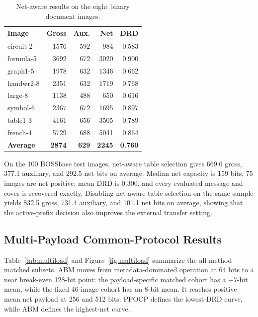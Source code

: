 \documentclass[a4paper,fleqn]{cas-dc}
\begin{document}
\begin{table}[t]
\centering
\caption{Net-aware results on the eight binary document images.}
\label{tab:document-net}
\begin{tabular}{@{}lrrrr@{}}
\toprule
\textbf{Image} & \textbf{Gross} & \textbf{Aux.} & \textbf{Net} & \textbf{DRD} \\
\midrule
circuit-2 & 1576 & 592 & 984 & 0.583 \\
formula-5 & 3692 & 672 & 3020 & 0.900 \\
graph1-5 & 1978 & 632 & 1346 & 0.662 \\
handwr2-8 & 2351 & 632 & 1719 & 0.768 \\
large-8 & 1138 & 488 & 650 & 0.616 \\
symbol-6 & 2367 & 672 & 1695 & 0.897 \\
table1-3 & 4161 & 656 & 3505 & 0.789 \\
french-4 & 5729 & 688 & 5041 & 0.864 \\
\midrule
\textbf{Average} & \textbf{2874} & \textbf{629} & \textbf{2245} & \textbf{0.760} \\
\bottomrule
\end{tabular}
\end{table}

On the 100 BOSSbase test images, net-aware table selection gives 669.6 gross,
377.1 auxiliary, and 292.5 net bits on average. Median net capacity is 159
bits, 75 images are net positive, mean DRD is 0.300, and every evaluated
message and cover is recovered exactly. Disabling net-aware table selection on
the same sample yields 832.5 gross, 731.4 auxiliary, and 101.1 net bits on
average, showing that the active-prefix decision also improves the external
transfer setting.

\subsection{Multi-Payload Common-Protocol Results}

Table~\ref{tab:multiload} and Figure~\ref{fig:multiload} summarize the
all-method matched subsets. ABM moves from metadata-dominated operation at
64 bits to a near break-even 128-bit point: the payload-specific matched cohort
has a $-7$-bit mean, while the fixed 46-image cohort has an 8-bit mean. It
reaches positive mean net payload at 256 and 512 bits. PPOCP defines the
lowest-DRD curve, while ABM defines the highest-net curve.
\end{document}
